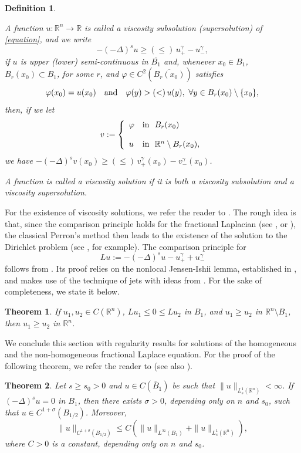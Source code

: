 \documentclass[11pt,reqno]{amsart}
\newtheorem{theorem}{Theorem}
\newtheorem{definition}{Definition}
\numberwithin{equation}{section}
\numberwithin{theorem}{section}
\numberwithin{lemma}{section}
\numberwithin{corollary}{section}
\numberwithin{remark}{section}
\numberwithin{proposition}{section}
\numberwithin{definition}{section}
\newcommand{\R}{\mathbb{R}}
\begin{document}
\begin{definition}\label{d2.2}

A function $u:\R^n\rightarrow\R$ is called a viscosity subsolution (supersolution) of \eqref{equation}, and we write 
$$
-(-\Delta)^su\geq (\leq)\, u_+^\gamma-u_-^\gamma,
$$
if $u$ is upper (lower) semi-continuous in $\overline{B_1}$ and, whenever $x_0\in B_1$, $B_r(x_0)\subset B_1$, for some $r$, and $\varphi \in C^2(\overline{B_r(x_0)})$ satisfies
$$\varphi(x_0)=u(x_0) \quad {\rm and} \quad \varphi(y)> (<) \, u(y), \ \forall y\in B_r(x_0) \setminus \{x_0\},$$
then, if we let
$$
v:=
\left\{
\begin{array}{ll}
\varphi & \hbox{in } \ B_r(x_0)\\
\\
u & \hbox{in } \ \R^n\setminus B_r(x_0),
\end{array}
\right.
$$
we have $-(-\Delta)^sv(x_0)\geq (\leq) \, v_+^\gamma(x_0)-v_-^\gamma(x_0)$.  

A function is called a viscosity solution if it is both a viscosity subsolution and a viscosity supersolution.
\end{definition}

For the existence of viscosity solutions, we refer the reader to \cite[Theorem 1.2]{BCI08}. The rough idea is that, since the comparison principle holds for the fractional Laplacian (see \cite[Theorem 5.2]{CS09}, \cite[Theorem 2.5]{CTU20} or \cite[Corollary 6.1]{T24}), the classical Perron's method then leads to the existence of the solution to the Dirichlet problem (see \cite{CIL92}, for example). The comparison principle for $$Lu:=-(-\Delta)^su-u_+^\gamma+u_-^\gamma$$  follows from \cite[Theorem 3]{BI08}. Its proof relies on the nonlocal Jensen-Ishii lemma, established in \cite[Lemma 1]{BI08}, and makes use of the technique of jets with ideas from \cite{CIL92}. For the sake of completeness, we state it below.
\begin{theorem}\label{comparison}
  If $u_1,u_2\in C(\R^n)$, $Lu_1\le0\le Lu_2$ in $B_1$, and $u_1\ge u_2$ in $\R^n\setminus B_1$, then $u_1\ge u_2$ in $\R^n$.  
\end{theorem}

We conclude this section with regularity results for solutions of the homogeneous and the non-homogeneous fractional Laplace equation.
For the proof of the following theorem, we refer the reader to \cite[Theorem 27]{CS11} (see also \cite[Theorem 13.1]{CS09}).

\begin{theorem}\label{regularity}
Let $s\ge s_0>0$ and $u\in C(\overline{B}_1)$ be such that $\|u\|_{L^1_s(\R^n)}<\infty$. If $(-\Delta)^su=0$ in $B_1$, then there exists $\sigma>0$, depending only on $n$ and $s_0$, such that $u\in C^{1+\sigma}(B_{1/2})$. Moreover,
$$
\|u\|_{C^{1+\sigma}(B_{1/2})}\le C\left(\|u\|_{L^\infty(B_1)}+\|u\|_{L^1_s(\R^n)}\right),
$$
where $C>0$ is a constant, depending only on $n$ and $s_0$.
\end{theorem}
\end{document}
